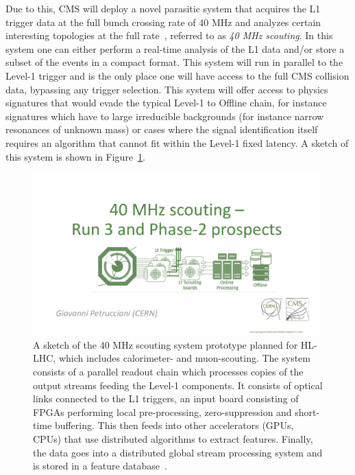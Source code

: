 \documentclass[12pt]{iopart}
\begin{document}
Due to this, CMS will deploy a novel parasitic system that acquires the L1 trigger data at the full bunch crossing rate of 40 MHz and analyzes certain interesting topologies at the full rate~\cite{40MhzSc}, referred to as \textit{40 MHz scouting}. In this system one can either perform a real-time analysis of the L1 data and/or store a subset of the events in a compact format. This system will run in parallel to the Level-1 trigger and is the only place one will have access to the full CMS collision data, bypassing any trigger selection. This system will offer access to physics signatures that would evade the typical Level-1 to Offline chain, for instance signatures which have to large irreducible backgrounds (for instance narrow resonances of unknown mass) or cases where the signal identification itself requires an algorithm that cannot fit within the Level-1 fixed latency.
A sketch of this system is shown in Figure~\ref{fig:scouting}.
\begin{figure}[htb!]
    \centering
    \includegraphics[width=0.99\textwidth]{figures/40mhz_scout.pdf}
    \caption{A sketch of the 40 MHz scouting system prototype planned for HL-LHC, which includes calorimeter- and muon-scouting. The system consists of a parallel readout chain which processes copies of the output streams feeding the Level-1 components. It consists of optical links connected to the L1 triggers, an input board consisting of FPGAs performing local pre-processing, zero-suppression and short-time buffering. This then feeds into other accelerators (GPUs, CPUs) that use distributed algorithms to extract features. Finally, the data goes into a distributed global stream processing system and is stored in a feature database~\cite{tdr}.
    }
    \label{fig:scouting}
\end{figure}
\end{document}

